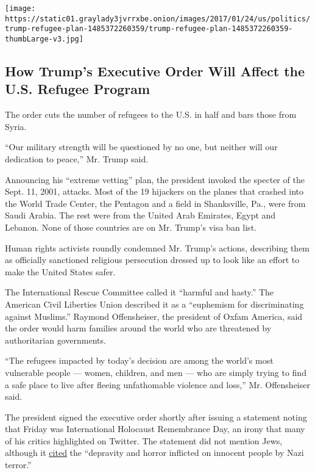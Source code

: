 \href{https://www.nytimes3xbfgragh.onion/interactive/2017/01/25/us/politics/trump-refugee-plan.html}{}

\texttt{[image: https://static01.graylady3jvrrxbe.onion/images/2017/01/24/us/politics/trump-refugee-plan-1485372260359/trump-refugee-plan-1485372260359-thumbLarge-v3.jpg]}

\hypertarget{how-trumps-executive-order-will-affect-the-us-refugee-program}{%
\subsection{How Trump's Executive Order Will Affect the U.S. Refugee
Program}\label{how-trumps-executive-order-will-affect-the-us-refugee-program}}

The order cuts the number of refugees to the U.S. in half and bars those
from Syria.

``Our military strength will be questioned by no one, but neither will
our dedication to peace,'' Mr. Trump said.

Announcing his ``extreme vetting'' plan, the president invoked the
specter of the Sept. 11, 2001, attacks. Most of the 19 hijackers on the
planes that crashed into the World Trade Center, the Pentagon and a
field in Shanksville, Pa., were from Saudi Arabia. The rest were from
the United Arab Emirates, Egypt and Lebanon. None of those countries are
on Mr. Trump's visa ban list.

Human rights activists roundly condemned Mr. Trump's actions, describing
them as officially sanctioned religious persecution dressed up to look
like an effort to make the United States safer.

The International Rescue Committee called it ``harmful and hasty.'' The
American Civil Liberties Union described it as a ``euphemism for
discriminating against Muslims.'' Raymond Offensheiser, the president of
Oxfam America, said the order would harm families around the world who
are threatened by authoritarian governments.

``The refugees impacted by today's decision are among the world's most
vulnerable people --- women, children, and men --- who are simply trying
to find a safe place to live after fleeing unfathomable violence and
loss,'' Mr. Offensheiser said.

The president signed the executive order shortly after issuing a
statement noting that Friday was International Holocaust Remembrance
Day, an irony that many of his critics highlighted on Twitter. The
statement did not mention Jews, although it
\href{https://www.whitehouse.gov/the-press-office/2017/01/27/statement-president-international-holocaust-remembrance-day}{cited}
the ``depravity and horror inflicted on innocent people by Nazi
terror.''

